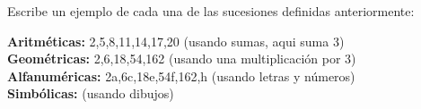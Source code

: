 
\question Escribe un ejemplo de cada una de las sucesiones definidas
          anteriormente:
  \begin{solution}[4cm]
    \textbf{Aritméticas:} 2,5,8,11,14,17,20 (usando sumas, aqui suma 3) \\
    \textbf{Geométricas:}  2,6,18,54,162 (usando una multiplicación por 3) \\
    \textbf{Alfanuméricas:} 2a,6c,18e,54f,162,h (usando letras y números) \\
    \textbf{Simbólicas:} (usando dibujos)
  \vspace{1cm}
  \end{solution}
